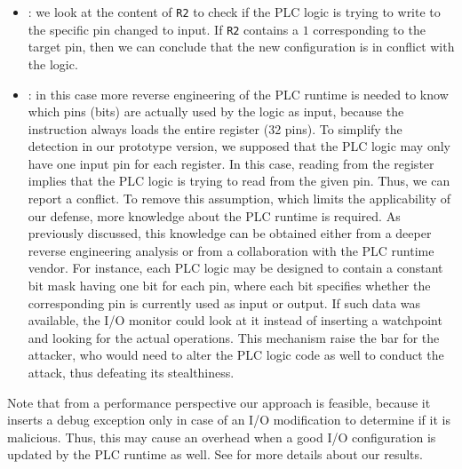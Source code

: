 \begin{itemize}
	\item {}: we look at the content of \verb|R2| to check if the PLC logic is trying to write to the specific pin changed to input.
		If \verb|R2| contains a $1$ corresponding to the target pin, then we can conclude that the new configuration is in conflict with the logic.
	\item {}: in this case more reverse engineering of the PLC runtime is needed to know which pins (\ie bits) are actually used by the logic as input,
		because the instruction always loads the entire register (32 pins).
		To simplify the detection in our prototype version, we supposed that the PLC logic may only have one input pin for each register.
		In this case, reading from the register implies that the PLC logic is trying to read from the given pin. Thus, we can report a conflict.
		To remove this assumption, which limits the applicability of our defense, more knowledge about the PLC runtime is required.
		As previously discussed, this knowledge can be obtained either from a deeper reverse engineering analysis or from a collaboration with the PLC runtime vendor.
		For instance, each PLC logic may be designed to contain a constant bit mask having one bit for each pin,
		where each bit specifies whether the corresponding pin is currently used as input or output. If such data was available,
		the I/O monitor could look at it instead of inserting a watchpoint and looking for the actual operations.
		This mechanism raise the bar for the attacker, who would need to alter the PLC logic code as well to conduct the attack,
		thus defeating its stealthiness.
\end{itemize}

Note that from a performance perspective our approach is feasible, because it inserts a debug exception only in case of an I/O modification to determine if it is malicious.
Thus, this may cause an overhead when a good I/O configuration is updated by the PLC runtime as well. See  for more details about our results.

